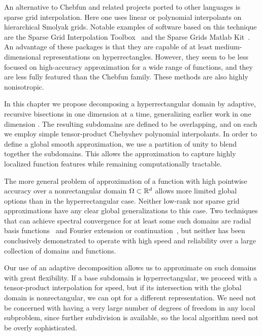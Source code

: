 An alternative to Chebfun and related projects ported to other languages is sparse grid interpolation. Here one uses linear or polynomial interpolants on hierarchical Smolyak grids. Notable examples of software based on this technique are the Sparse Grid Interpolation Toolbox~\cite{Klimke2005} and the Sparse Grids Matlab Kit~\cite{Back2011}. An advantage of these packages is that they are capable of at least medium-dimensional representations on hyperrectangles. However, they seem to be less focused on high-accuracy approximation for a wide range of functions, and they are less fully featured than the Chebfun family. These methods are also highly nonisotropic.

In this chapter we propose decomposing a hyperrectangular domain by adaptive, recursive bisections in one dimension at a time, generalizing earlier work in one dimension \cite{Aiton2018}. The resulting subdomains are defined to be overlapping, and on each we employ simple tensor-product Chebyshev polynomial interpolants. In order to define a global smooth approximation, we use a partition of unity to blend together the subdomains. This allows the approximation to capture highly localized function features while remaining computationally tractable.

The more general problem of approximation of a function with high pointwise accuracy over a nonrectangular domain $\Omega \subset \mathbb{R}^d$ allows more limited global options than in the hyperrectangular case. Neither low-rank nor sparse grid approximations have any clear global generalizations to this case. Two techniques that can achieve spectral convergence for at least some such domains are radial basis functions~\cite{Fornberg2015} and Fourier extension or continuation~\cite{adcock2014resolution}, but neither has been conclusively demonstrated to operate with high speed and reliability over a large collection of domains and functions.

Our use of an adaptive decomposition allows us to approximate on such domains with great flexibility. If a base subdomain is hyperrectangular, we proceed with a tensor-product interpolation for speed, but if its intersection with the global domain is nonrectangular, we can opt for a different representation. We need not be concerned with having a very large number of degrees of freedom in any local subproblem, since further subdivision is available, so the local algorithm need not be overly sophisticated. 


